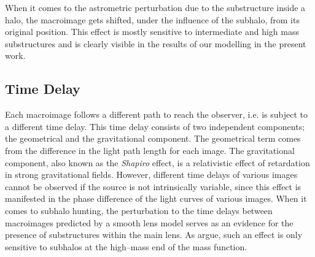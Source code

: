 \documentclass[a4wide,12pt]{book}
\newcommand{\ignore}[1]{}
\begin{document}
{When it comes to the astrometric perturbation due to the substructure inside a halo, the macroimage gets shifted, under the influence of the subhalo, from its original position. This effect is mostly sensitive to intermediate and high mass substructures \citet{Moustakas+2009} and is clearly visible in the results of our modelling in the present work. %

 
\subsection{Time Delay}
Each macroimage follows a different path to reach the observer, i.e. is subject to a different time delay. This time delay consists of two independent components; the geometrical and the gravitational component. The geometrical term comes from the difference in the light path length for each image. The gravitational component, also known as the \emph{Shapiro} effect, is a relativistic effect of retardation in strong gravitational fields. However, different time delays of various images cannot be observed if the source is not intrinsically variable, since this effect is manifested in the phase difference of the light curves of various images. When it comes to subhalo hunting, the perturbation to the time delays between macroimages predicted by a smooth lens model serves as an evidence for the presence of substructures within the main lens\ignore{ (see Figure \hyperref[fig:time_delay]{2.4})}. As \citet{Moustakas+2009} argue, such an effect is only sensitive to subhalos at the high--mass end of the mass function.
 
 
}
\end{document}
